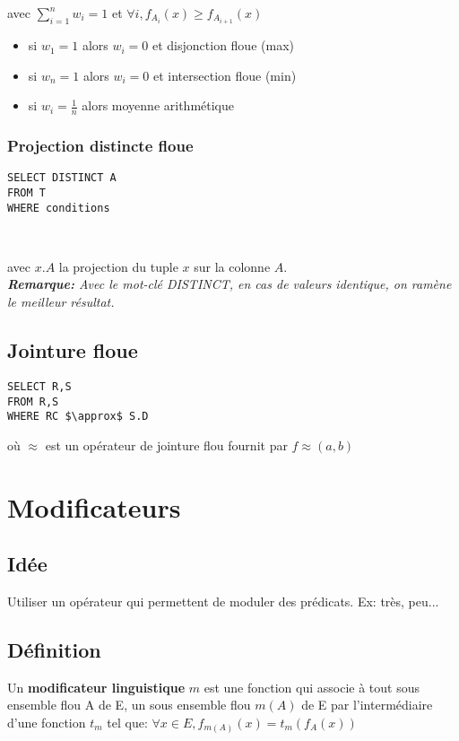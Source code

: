 \documentclass[a4paper,11pt]{article}
\begin{document}
avec $\sum_{i=1}^{n} w_i=1$ et $\forall i,f_{A_i}(x)\geq f_{A_{i+1}}(x)$

\begin{itemize}
	\item si $w_1=1$ alors $w_i=0$ et disjonction floue (max)
	\item si $w_n=1$ alors $w_i=0$ et intersection floue (min)
	\item si $w_i=\frac{1}{n}$ alors moyenne arithmétique
\end{itemize}

\subsubsection{Projection distincte floue}
\begin{lstlisting}[mathescape]
SELECT DISTINCT A
FROM T
WHERE conditions
\end{lstlisting}
~

 avec $x.A$ la projection du tuple $x$ sur la colonne $A$. \\

\emph{\textbf{Remarque:} Avec le mot-clé DISTINCT, en cas de valeurs identique, on ramène le meilleur résultat.}\\

\subsection{Jointure floue}
 
\begin{lstlisting}[mathescape]
SELECT R,S
FROM R,S
WHERE RC $\approx$ S.D
\end{lstlisting}
où $\approx$ est un opérateur de jointure flou fournit par $f \approx (a,b)$ \\


\section{Modificateurs}
\subsection{Idée}
Utiliser un opérateur qui permettent de moduler des prédicats. Ex: très, peu...
\subsection{Définition}
Un \textbf{modificateur linguistique} $m$ est une fonction qui associe à tout sous ensemble flou A de E, un sous ensemble flou $m(A)$ de E par l'intermédiaire d'une fonction $t_m$ tel que:
$\forall x \in E,f_{m(A)}(x)=t_m(f_A(x)) $
\end{document}
